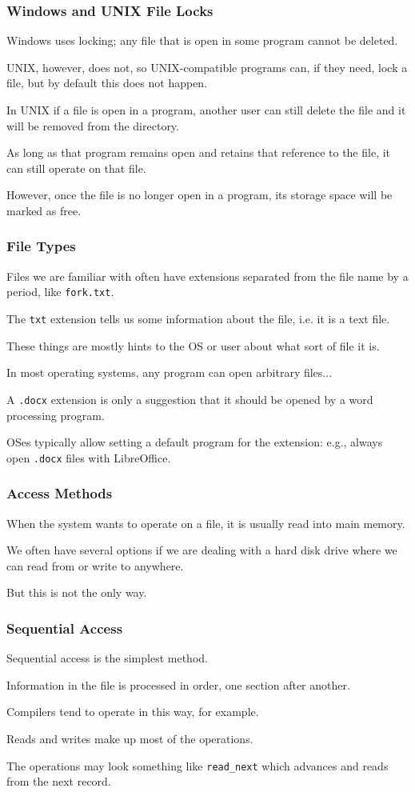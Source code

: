 \begin{frame}
\frametitle{Windows and UNIX File Locks}

Windows uses locking; any file that is open in some program cannot be deleted. 

UNIX, however, does not, so UNIX-compatible programs can, if they need, lock a file, but by default this does not happen. 

In UNIX if a file is open in a program, another user can still delete the file and it will be removed from the directory. 

As long as that program remains open and retains that reference to the file, it can still operate on that file. 

However, once the file is no longer open in a program, its storage space will be marked as free.


\end{frame}

\begin{frame}
\frametitle{File Types}

Files we are familiar with often have extensions separated from the file name by a period, like \texttt{fork.txt}. 

The \texttt{txt} extension tells us some information about the file, i.e. it is a text file. 

These things are mostly hints to the OS or user about what sort of file it is. 

In most operating systems, any program can open arbitrary files... 

A \texttt{.docx} extension is only a suggestion that it should be opened by a word processing program.

OSes typically allow setting a default program for the extension: e.g., always open \texttt{.docx} files with LibreOffice.


\end{frame}

\begin{frame}
\frametitle{Access Methods}

When the system wants to operate on a file, it is usually read into main memory. 

We often have several options if we are dealing with a hard disk drive where we can read from or write to anywhere. 

But this is not the only way.

\end{frame}

\begin{frame}
\frametitle{Sequential Access}

\alert{Sequential access} is the simplest method. 

Information in the file is processed in order, one section after another. 

Compilers tend to operate in this way, for example. 

Reads and writes make up most of the operations.

The operations may look something like \texttt{read\_next} which advances and reads from the next record.

\end{frame}

